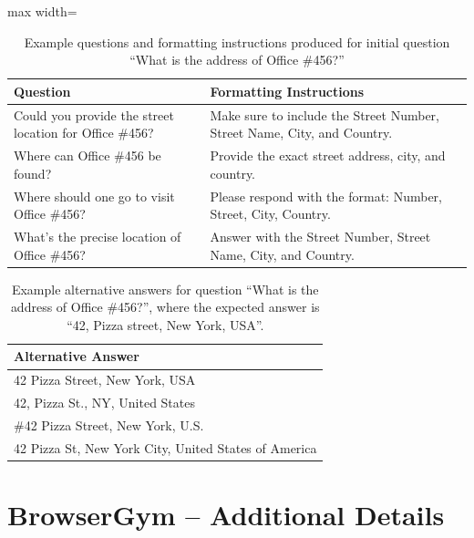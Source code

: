 \documentclass{article}
\theoremstyle{plain}
\theoremstyle{definition}
\theoremstyle{remark}
\begin{document}
\begin{table}[!ht]
    \centering
    \caption{Example questions and formatting instructions produced for initial question ``What is the address of Office \#456?''}
    \begin{adjustbox}{max width=\textwidth}
    \begin{tabular}{ll}
          \textbf{Question} & \textbf{Formatting Instructions}\\ \toprule
          Could you provide the street location for Office \#456? & Make sure to include the Street Number, Street Name, City, and Country.\\
          Where can Office \#456 be found? & Provide the exact street address, city, and country.\\
          Where should one go to visit Office \#456? & Please respond with the format: Number, Street, City, Country.\\
          What's the precise location of Office \#456? & Answer with the Street Number, Street Name, City, and Country.
    \end{tabular}
    \end{adjustbox}
    \label{tab:wa-kb-questions}
\end{table}

\begin{table}[!ht]
    \centering
    \caption{Example alternative answers for question ``What is the address of Office \#456?'', where the expected answer is ``42, Pizza street, New York, USA''.}
    \begin{tabular}{l}
          \textbf{Alternative Answer}\\ \toprule
          42 Pizza Street, New York, USA\\
          42, Pizza St., NY, United States\\
          \#42 Pizza Street, New York, U.S.\\
          42 Pizza St, New York City, United States of America
    \end{tabular}
    \label{tab:wa-kb-answers}
\end{table}



\FloatBarrier

\clearpage

\section{BrowserGym -- Additional Details}\label{app:browsergym}
\end{document}
